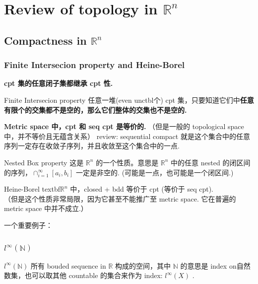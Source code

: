 \chapter{Review of topology in $\mathbb{R}^n$}


\section{Compactness in $\mathbb{R}^n$}
\subsection{Finite Intersecion property and Heine-Borel}
\begin{theorem}
    \textbf{cpt 集的任意闭子集都继承 cpt 性.}
\end{theorem}

\begin{theorem}{Finite Intersecion property} \label{Finite Intersecion property}
   任意一堆(even unctbl个) cpt 集，只要知道它们中\textbf{任意有限个的交集都不是空的，那么它们整体的交集也不是空的. }
\end{theorem}


\begin{theorem}
    \textbf{Metric space 中，cpt 和 seq cpt 是等价的.}
    （但是一般的 topological space 中，并不等价且无蕴含关系）
    review: sequential compact 就是这个集合中的任意序列一定存在收敛子序列，并且收敛至这个集合中的一点.
\end{theorem}

\begin{theorem}{Nested Box property} \label{Nested Box property}
    这是 $\mathbb{R}^n$ 的一个性质。意思是 $\mathbb{R}^n$ 中的任意 nested 的闭区间的序列，$\cap_{i=1} ^\infty [a_i, b_i]$ 一定是非空的. (可能是一点，也可能是一个闭区间.) 
\end{theorem}

\begin{theorem}{Heine-Borel} \label{Heine-Borel}
    textbf{$\mathbb{R}^n$ 中，closed + bdd 等价于 cpt (等价于 seq cpt).} \\
（但是这个性质非常局限，因为它甚至不能推广至 metric space. 它在普遍的 metric space 中并不成立.）
\end{theorem}

一个重要例子：
\subsection{$l^{\infty}(\mathbb{N})$}

\begin{definition}{$l^{\infty}(\mathbb{N})$} \label{linfinity}
    所有 bouded sequence in $\mathbb{R}$ 构成的空间，其中 $\mathbb{N}$ 的意思是 index on自然数集，也可以取其他 countable 的集合来作为 index: $l^{\infty}(X)$ .
\end{definition}


